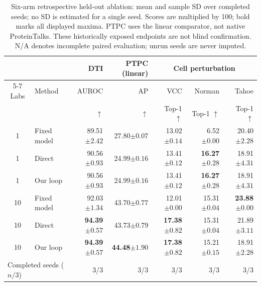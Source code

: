 \begin{table}[t]
\centering\small
\setlength{\tabcolsep}{3pt}
\begin{tabular}{clrrrrr}
\toprule
 & & DTI & PTPC (linear) & \multicolumn{3}{c}{Cell perturbation} \\
\cmidrule(lr){5-7}
Labs & Method & AUROC & AP & VCC & Norman & Tahoe \\
 & & $\uparrow$ & $\uparrow$ & Top-1 $\uparrow$ & Top-1 $\uparrow$ & Top-1 $\uparrow$ \\
\midrule
1 & Fixed model & 89.51{\scriptsize$\pm2.42$} & 27.80{\scriptsize$\pm0.07$} & 13.02{\scriptsize$\pm0.14$} & 6.52{\scriptsize$\pm0.00$} & 20.40{\scriptsize$\pm2.28$} \\
1 & Direct & 90.56{\scriptsize$\pm0.93$} & 24.99{\scriptsize$\pm0.16$} & 13.41{\scriptsize$\pm0.12$} & \textbf{16.27}{\scriptsize$\pm0.28$} & 18.91{\scriptsize$\pm4.31$} \\
1 & Our loop & 90.56{\scriptsize$\pm0.93$} & 24.99{\scriptsize$\pm0.16$} & 13.41{\scriptsize$\pm0.12$} & \textbf{16.27}{\scriptsize$\pm0.28$} & 18.91{\scriptsize$\pm4.31$} \\
\midrule
10 & Fixed model & 92.03{\scriptsize$\pm1.34$} & 43.70{\scriptsize$\pm0.77$} & 12.01{\scriptsize$\pm0.00$} & 15.31{\scriptsize$\pm0.04$} & \textbf{23.88}{\scriptsize$\pm0.00$} \\
10 & Direct & \textbf{94.39}{\scriptsize$\pm0.57$} & 43.73{\scriptsize$\pm0.79$} & \textbf{17.38}{\scriptsize$\pm0.82$} & 15.31{\scriptsize$\pm0.04$} & 21.89{\scriptsize$\pm3.11$} \\
10 & Our loop & \textbf{94.39}{\scriptsize$\pm0.57$} & \textbf{44.48}{\scriptsize$\pm1.90$} & \textbf{17.38}{\scriptsize$\pm0.82$} & 15.21{\scriptsize$\pm0.15$} & 18.91{\scriptsize$\pm2.28$} \\
\midrule
\multicolumn{2}{l}{Completed seeds ($n/3$)} & 3/3 & 3/3 & 3/3 & 3/3 & 3/3 \\
\bottomrule
\end{tabular}
\caption{Six-arm retrospective held-out ablation: mean and sample SD over completed seeds; no SD is estimated for a single seed. Scores are multiplied by 100; bold marks all displayed maxima. PTPC uses the linear comparator, not native ProteinTalks. These historically exposed endpoints are not blind confirmation. N/A denotes incomplete paired evaluation; unrun seeds are never imputed.}
\label{tab:unified-heldout-ablation}
\end{table}
